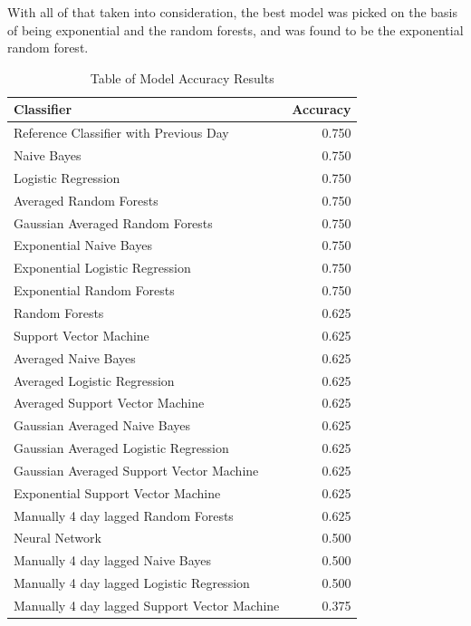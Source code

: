 With all of that taken into consideration, the best model was picked on the basis of being exponential and the random forests, and was found to be the exponential random forest.
\begin{table}[H]
	\centering 
\begin{tabular}{lr}

	Classifier &  Accuracy \\
	\hline
	Reference Classifier with Previous Day & 0.750\\
	\hline
                                  Naive Bayes &     0.750 \\
Logistic Regression &     0.750 \\
Averaged Random Forests &     0.750 \\
Gaussian Averaged Random Forests &     0.750 \\
Exponential Naive Bayes &     0.750 \\
Exponential Logistic Regression &     0.750 \\
Exponential Random Forests &     0.750 \\
Random Forests &     0.625 \\
Support Vector Machine &     0.625 \\
Averaged Naive Bayes &     0.625 \\
Averaged Logistic Regression &     0.625 \\
Averaged Support Vector Machine &     0.625 \\
Gaussian Averaged Naive Bayes &     0.625 \\
Gaussian Averaged Logistic Regression &     0.625 \\
Gaussian Averaged Support Vector Machine &     0.625 \\
Exponential Support Vector Machine &     0.625 \\
Manually 4 day lagged Random Forests &     0.625 \\
Neural Network & 0.500 \\
Manually 4 day lagged Naive Bayes &     0.500 \\
Manually 4 day lagged Logistic Regression &     0.500 \\
Manually 4 day lagged Support Vector Machine &     0.375 \\
	

\end{tabular}

	\caption{Table of Model Accuracy Results}
		\label{table:modaccuracy}
\end{table}

